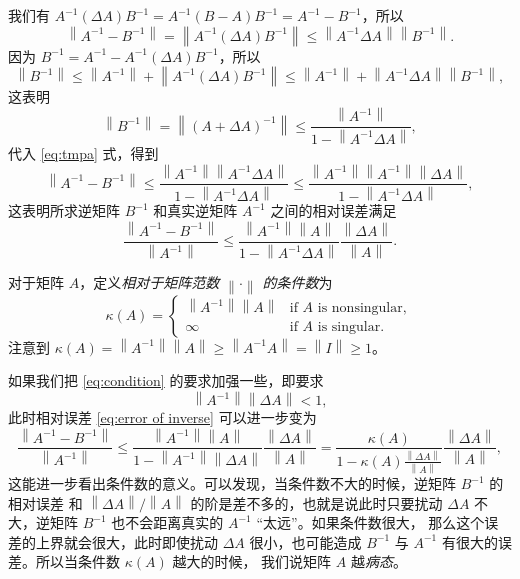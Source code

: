 \documentclass[fontset=none,zihao=-4]{Notes}
\newcommand{\norm}[1]{\left\lVert#1\right\rVert}
\begin{document}
我们有 $A^{-1}(\Delta A) B^{-1}=A^{-1}(B-A)B^{-1}=A^{-1}-B^{-1}$，所以
\begin{equation}\label{eq:tmpa}
  \norm{A^{-1}-B^{-1}}=\norm{A^{-1}(\Delta A)B^{-1}}  \leq
  \norm{A^{-1}\Delta A}\norm{B^{-1}}.
\end{equation}
因为 $B^{-1}=A^{-1}-A^{-1}(\Delta A)B^{-1}$，所以
\[
  \norm{B^{-1}}\leq \norm{A^{-1}}+\norm{A^{-1}(\Delta A)B^{-1}}\leq
  \norm{A^{-1}}+\norm{A^{-1}\Delta A}\norm{B^{-1}},  
\]
这表明
\begin{equation}\label{eq:estimate error}
  \norm{B^{-1}}=\norm{(A+\Delta A)^{-1}}\leq\frac{\norm{A^{-1}}}{1-\norm{A^{-1}\Delta A}}  ,
\end{equation}
代入 \eqref{eq:tmpa} 式，得到
\[
  \norm{A^{-1}-B^{-1}}\leq \frac{\norm{A^{-1}}\norm{A^{-1}\Delta A}}{1-\norm{A^{-1}\Delta A}}
  \leq \frac{\norm{A^{-1}}\norm{A^{-1}}\norm{\Delta A}}{1-\norm{A^{-1}\Delta A}}  ,
\]
这表明所求逆矩阵 $B^{-1}$ 和真实逆矩阵 $A^{-1}$ 之间的相对误差满足
\begin{equation}\label{eq:error of inverse}
  \frac{\norm{A^{-1}-B^{-1}}}{\norm{A^{-1}}}\leq 
  \frac{\norm{A^{-1}}\norm{A}}{1-\norm{A^{-1}\Delta A}}\frac{\norm{\Delta A}}{\norm{A}}.
\end{equation}

对于矩阵 $A$，定义\emph{相对于矩阵范数 $\norm{\cdot}$ 的条件数}为
\[
  \kappa(A)=\begin{cases}
    \norm{A^{-1}}\norm{A} & \text{if $A$ is nonsingular},\\
    \infty & \text{if $A$ is singular}.
  \end{cases}
\]
注意到 $\kappa(A)=\norm{A^{-1}}\norm{A}\geq\norm{A^{-1}A}=\norm{I}\geq 1$。

如果我们把 \eqref{eq:condition} 的要求加强一些，即要求
\begin{equation}
  \norm{A^{-1}}\norm{\Delta A}<1,
\end{equation}
此时相对误差 \eqref{eq:error of inverse} 可以进一步变为
\[
  \frac{\norm{A^{-1}-B^{-1}}}{\norm{A^{-1}}}\leq 
  \frac{\norm{A^{-1}}\norm{A}}{1-\norm{A^{-1}}\norm{\Delta A}}\frac{\norm{\Delta A}}{\norm{A}}
  =\frac{\kappa(A)}{1-\kappa(A)\frac{\norm{\Delta A}}{\norm A}}\frac{\norm{\Delta A}}{\norm{A}},
\]
这能进一步看出条件数的意义。可以发现，当条件数不大的时候，逆矩阵 $B^{-1}$ 的相对误差
和 $\norm{\Delta A}/\norm{A}$ 的阶是差不多的，也就是说此时只要扰动 $\Delta A$ 
不大，逆矩阵 $B^{-1}$ 也不会距离真实的 $A^{-1}$ “太远”。如果条件数很大，
那么这个误差的上界就会很大，此时即使扰动 $\Delta A$ 很小，也可能造成
$B^{-1}$ 与 $A^{-1}$ 有很大的误差。所以当条件数 $\kappa(A)$ 越大的时候，
我们说矩阵 $A$ 越\emph{病态}。
\end{document}
